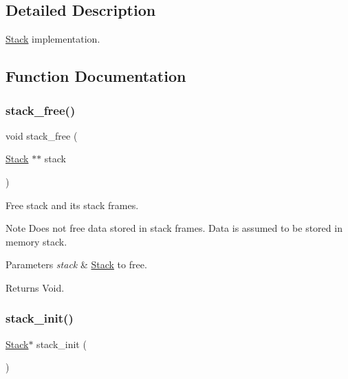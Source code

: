 \subsection{Detailed Description}
\hyperlink{structStack}{Stack} implementation. 



\subsection{Function Documentation}
\mbox{\label{group__Stack_ga88c5e1bfd0fccd7738393f47dc946674}} 
\subsubsection{\texorpdfstring{stack\+\_\+free()}{stack\_free()}}
{\footnotesize\ttfamily void stack\+\_\+free (\begin{DoxyParamCaption}\item[{\hyperlink{structStack}{Stack} $\ast$$\ast$}]{stack }\end{DoxyParamCaption})}



Free stack and its stack frames. 

\begin{DoxyNote}{Note}
Does not free data stored in stack frames. Data is assumed to be stored in memory stack.
\end{DoxyNote}

\begin{DoxyParams}{Parameters}
{\em stack} & \hyperlink{structStack}{Stack} to free. \\
\hline
\end{DoxyParams}
\begin{DoxyReturn}{Returns}
Void. 
\end{DoxyReturn}
\mbox{\label{group__Stack_ga6ed22bc6b5d4779a67eb400d7b6e3dfd}} 
\subsubsection{\texorpdfstring{stack\+\_\+init()}{stack\_init()}}
{\footnotesize\ttfamily \hyperlink{structStack}{Stack}$\ast$ stack\+\_\+init (\begin{DoxyParamCaption}{ }\end{DoxyParamCaption})}



